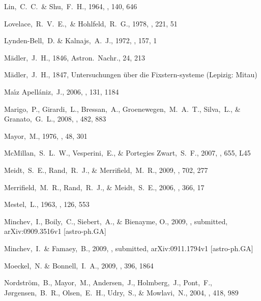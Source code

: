 \begin{thebibliography}{99}
  Lin,~C.~C.~\& Shu,~F.~H., 1964,
  \apj, 140, 646

  Lovelace,~R.~V.~E.,~\& Hohlfeld,~R.~G., 1978,
  \apj, 221, 51

  Lynden-Bell,~D. \& Kalnajs,~A.~J., 1972,
  \mnras, 157, 1

  M\"{a}dler,~J.~H., 1846, Astron.~Nachr., 24, 213

  M\"{a}dler,~J.~H., 1847, Untersuchungen \"{u}ber die Fixstern-systeme (Lepizig: Mitau)

  Ma{\'{\i}}z Apell{\'a}niz,~J., 2006,
  \aj, 131, 1184

  Marigo,~P., Girardi,~L., Bressan,~A., Groenewegen,~M.~A.~T., Silva,~L., \& Granato,~G.~L., 2008,
  \aap, 482, 883

  Mayor,~M., 1976,
  \aap, 48, 301

  McMillan,~S.~L.~W., Vesperini,~E., \& Portegies Zwart,~S.~F., 2007,
  \apjl, 655, L45

  Meidt,~S.~E., Rand,~R.~J., \& Merrifield,~M.~R., 2009,
  \apj, 702, 277

  Merrifield,~M.~R., Rand,~R.~J., \& Meidt,~S.~E., 2006,
  \mnras, 366, 17

  Mestel,~L., 1963,
  \mnras, 126, 553

  Minchev,~I., Boily,~C., Siebert,~A., \& Bienayme, O., 2009,
  \mnras, submitted,
  arXiv:0909.3516v1 [astro-ph.GA]

  Minchev,~I.~\& Famaey,~B., 2009,
  \apjl, submitted,
  arXiv:0911.1794v1 [astro-ph.GA]

  Moeckel,~N. \& Bonnell,~I.~A., 2009,
  \mnras, 396, 1864

  Nordstr{\"o}m,~B., Mayor,~M., Andersen,~J., Holmberg,~J., Pont,~F., J{\o}rgensen,~B.~R., Olsen,~E.~H., Udry,~S., \& Mowlavi,~N., 2004,
    \aap, 418, 989


\end{thebibliography}
